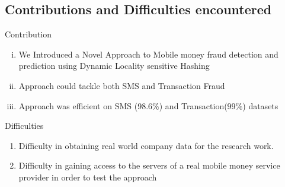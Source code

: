 \documentclass[11pt,aspectratio=169]{beamer}
\begin{document}
		\subsection{Contributions and Difficulties encountered}
		\begin{frame}
			\begin{block}{Contribution}
				\begin{enumerate}[i)]
					\item We Introduced a Novel Approach to Mobile money fraud detection and prediction using Dynamic Locality sensitive Hashing
					
					
					\item Approach could tackle  both SMS and Transaction Fraud
					
					
					\item Approach was efficient on SMS (98.6$\%$) and Transaction(99$\%$) datasets
					
					
					
				\end{enumerate}
				
			\end{block}
	
		
			\begin{block}{Difficulties}
				\begin{enumerate}
					\item Difficulty in obtaining real world company data for the research work. 
					
					\item Difficulty in gaining access to the servers of a real mobile money service provider in order to test the approach
			\end{enumerate}
			\end{block}
		\end{frame}
	
\end{document}

